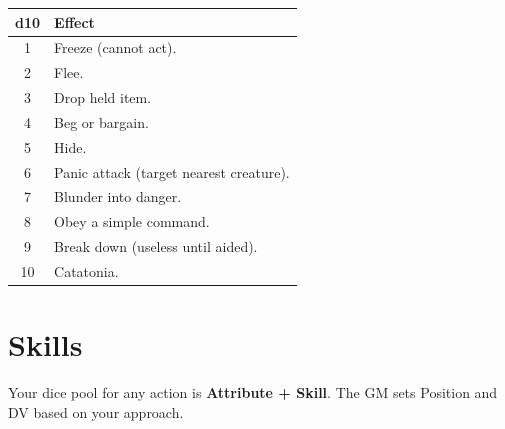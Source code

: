 \begin{center}
\begin{tabular}{cl}
\toprule
d10 & Effect \\
\midrule
1 & Freeze (cannot act). \\
2 & Flee. \\
3 & Drop held item. \\
4 & Beg or bargain. \\
5 & Hide. \\
6 & Panic attack (target nearest creature). \\
7 & Blunder into danger. \\
8 & Obey a simple command. \\
9 & Break down (useless until aided). \\
10 & Catatonia. \\
\bottomrule
\end{tabular}
\end{center}

\section{Skills}\label{sec:skills}

Your dice pool for any action is \textbf{Attribute + Skill}. The GM sets
Position and DV based on your approach.

